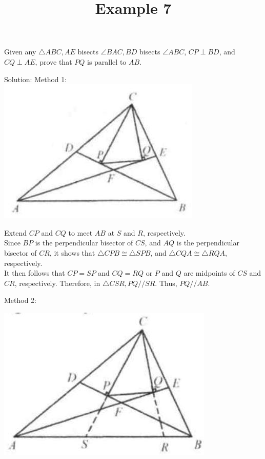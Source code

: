 \documentclass{article}
\title{Example 7}
\date{}
\begin{document}
\maketitle

Given any \(\triangle A B C, A E\) bisects \(\angle B A C, B D\) bisects \(\angle A B C\), \(C P \perp B D\), and \(C Q \perp A E\), prove that \(P Q\) is parallel to \(A B\).

Solution:
Method 1:\\
\centering
\includegraphics[width=\textwidth]{images/058(2).jpg}


Extend \(C P\) and \(C Q\) to meet \(A B\) at \(S\) and \(R\), respectively.\\
Since \(B P\) is the perpendicular bisector of \(C S\), and \(A Q\) is the perpendicular bisector of \(C R\), it shows that \(\triangle C P B \cong \triangle S P B\), and \(\triangle C Q A \cong \triangle R Q A\), respectively.\\
It then follows that \(C P=S P\) and \(C Q=R Q\) or \(P\) and \(Q\) are midpoints of \(C S\) and \(C R\), respectively. Therefore, in \(\triangle C S R, P Q / / S R\). Thus, \(P Q / / A B\).

Method 2:
\begin{center}
\includegraphics[width=\textwidth]{images/059(3).jpg}
\end{center}
\end{document}
